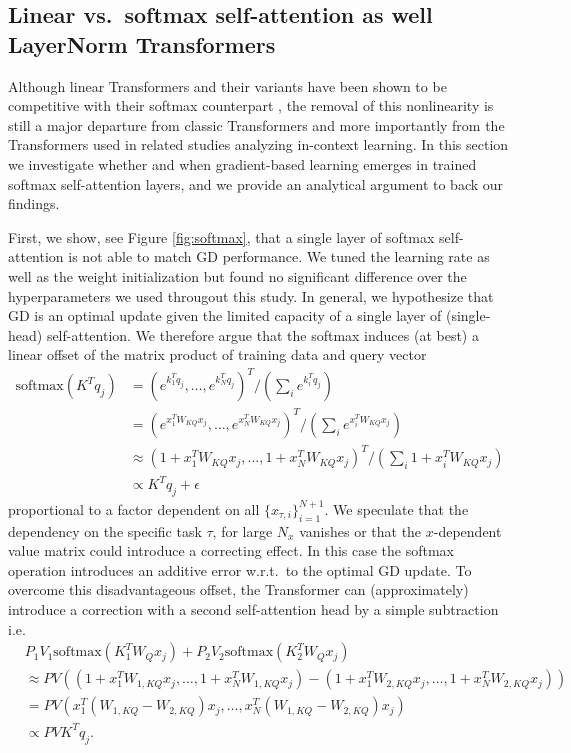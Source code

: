 \documentclass{article}
\theoremstyle{plain}
\theoremstyle{definition}
\theoremstyle{remark}
\begin{document}
\subsection{Linear vs.~softmax self-attention as well LayerNorm Transformers}
\label{app:softmax}

\label{ref:linear_vs_softmax} Although linear Transformers and their variants have been shown to be competitive with their softmax counterpart \citep{irie2021going}, the removal of this nonlinearity is still a major departure from classic Transformers and more importantly from the Transformers used in related studies analyzing in-context learning. In this section we investigate whether and when gradient-based learning emerges in trained softmax self-attention layers, and we provide an analytical argument to back our findings.

First, we show, see Figure \ref{fig:softmax}, that a single layer of softmax self-attention is not able to match GD performance. We tuned the learning rate as well as the weight initialization but found no significant difference over the hyperparameters we used througout this study. In general, we hypothesize that GD is an optimal update given the limited capacity of a single layer of (single-head) self-attention. We  therefore argue that the softmax induces (at best) a linear offset of the matrix product of training data and query vector
\begin{align}
    \text{softmax}(K^Tq_j) &= (e^{k_1^Tq_j}, \dots , e^{k_N^Tq_j})^T/ (\sum_i  e^{k_i^Tq_j}) \\
    &= (e^{x_1^TW_{KQ}x_j}, \dots , e^{x_N^TW_{KQ}x_j})^T/ (\sum_i  e^{x_i^TW_{KQ}x_j}) \\
    &\approx (1 + x_1^TW_{KQ}x_j, \dots , 1 +  x_N^TW_{KQ}x_j)^T/ (\sum_i  1 +  x_i^TW_{KQ}x_j) \\
    &\propto K^Tq_j  + \epsilon
\end{align}
proportional to a factor dependent on all $\{x_{\tau, i}\}_{i=1}^{N+1}$. We speculate that the dependency on the specific task $\tau$, for large $N_x$ vanishes or that the $x$-dependent value matrix could introduce a correcting effect. In this case the softmax operation introduces an additive error w.r.t.~to the optimal GD update. To overcome this disadvantageous offset, the Transformer can (approximately) introduce a correction with a second self-attention head by a simple subtraction i.e.
\begin{align}
 & P_1V_1\text{softmax}(K_1^TW_Qx_j) + P_2V_2\text{softmax}(K_2^TW_Qx_j) \\& \approx PV((1 + x_1^TW_{1,KQ}x_j, \dots , 1 +  x_N^TW_{1, KQ}x_j) -  (1 + x_1^TW_{2, KQ}x_j, \dots , 1 +  x_N^TW_{2, KQ}x_j)) \\ 
 &= PV(x_1^T(W_{1,KQ} - W_{2,KQ})x_j, \dots , x_N^T(W_{1,KQ} - W_{2,KQ})x_j) \\ & \propto PVK^Tq_j.
\end{align}
\end{document}
